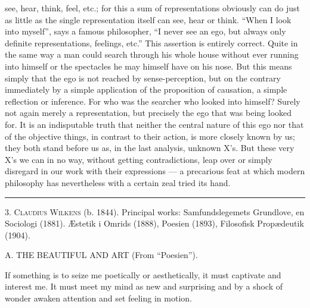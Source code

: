 \documentclass[12pt,a4paper,openany]{book}
\newcommand{\opage}[1]{\marginnote{\footnotesize\textit{[#1]}}}
\newcommand{\excerpthead}[1]{\par\bigskip\begin{center}#1\end{center}\nopagebreak\smallskip}
\newenvironment{intro}{\par}{\par}
\newcommand{\sectionrule}{\par\begin{center}\rule{4em}{0.4pt}\end{center}}
\begin{document}
see, hear, think, feel, etc.; for this a sum of representations obviously can do just as
little as the single representation itself can see, hear or think. ``When I look into
myself'', says a famous philosopher, ``I never see an ego, but always only definite
representations, feelings, etc.'' This assertion is entirely correct. Quite in the same
way a man could search through his whole house without ever running into himself or the
spectacles he may himself have on his nose. But this means simply that the ego is not
reached by sense-perception, but on the contrary immediately by a simple application of
the proposition of causation, a simple reflection or inference. For who was the searcher
who looked into himself? Surely not again merely a representation, but precisely the ego
that was being looked for. It is an indisputable truth that neither the central nature of
this ego nor that of the objective things, in contrast to their action, is more closely
known by us; they both stand before us as, in the last analysis, unknown X's. But these
very X's we can in no way, without getting contradictions, leap over or simply disregard
in our work with their expressions --- a precarious feat at which modern philosophy has
nevertheless with a certain zeal tried its hand.

\sectionrule

\begin{intro}

3. \textsc{Claudius Wilkens} (b. 1844). Principal works: Samfundslegemets
Grundlove, en Sociologi (1881). Æstetik i Omrids
(1888), Poesien (1893), Filosofisk Propædeutik (1904).
\end{intro}

\setcounter{footnote}{0}%
\excerpthead{A. THE BEAUTIFUL AND ART (From ``Poesien'').}\opage{260}

If something is to seize me poetically or aesthetically, it must captivate and interest
me. It must meet my mind as new and surprising and by a shock of wonder awaken attention
and set feeling in motion.
\end{document}

